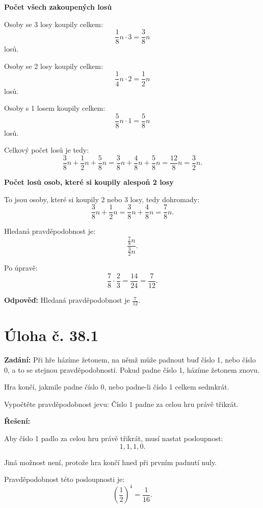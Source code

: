 \documentclass[12pt,a4paper]{article}
\begin{document}
\medskip

\textbf{Počet všech zakoupených losů}

Osoby se 3 losy koupily celkem:
\[
\frac18 n \cdot 3 = \frac38 n
\]
losů.

Osoby se 2 losy koupily celkem:
\[
\frac14 n \cdot 2 = \frac12 n
\]
losů.

Osoby s 1 losem koupily celkem:
\[
\frac58 n \cdot 1 = \frac58 n
\]
losů.

Celkový počet losů je tedy:
\[
\frac38 n+\frac12 n+\frac58 n
= \frac38 n+\frac48 n+\frac58 n
= \frac{12}{8}n
= \frac32 n.
\]

\medskip

\textbf{Počet losů osob, které si koupily alespoň 2 losy}

To jsou osoby, které si koupily 2 nebo 3 losy, tedy dohromady:
\[
\frac38 n+\frac12 n
= \frac38 n+\frac48 n
= \frac78 n.
\]

\medskip

Hledaná pravděpodobnost je:
\[
\frac{\frac78 n}{\frac32 n}.
\]

Po úpravě:
\[
\frac78 \cdot \frac23 = \frac{14}{24}=\frac{7}{12}.
\]

\bigskip

\textbf{Odpověď:}  
Hledaná pravděpodobnost je \(\frac{7}{12}\).


\newpage
\section*{Úloha č. 38.1}

\textbf{Zadání:}  
Při hře házíme žetonem, na němž může padnout buď číslo 1, nebo číslo 0, a to se stejnou pravděpodobností.  
Pokud padne číslo 1, házíme žetonem znovu.

Hra končí, jakmile padne číslo 0, nebo padne-li číslo 1 celkem sedmkrát.

Vypočtěte pravděpodobnost jevu:  
Číslo 1 padne za celou hru právě třikrát.

\bigskip

\textbf{Řešení:}

Aby číslo 1 padlo za celou hru právě třikrát, musí nastat posloupnost:
\[
1,1,1,0.
\]

Jiná možnost není, protože hra končí hned při prvním padnutí nuly.

Pravděpodobnost této posloupnosti je:
\[
\left(\frac12\right)^4=\frac{1}{16}.
\]
\end{document}
